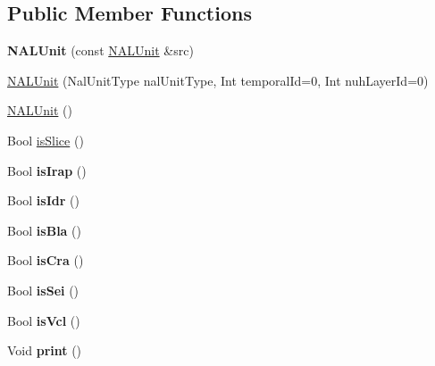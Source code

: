 \subsection*{Public Member Functions}
\begin{DoxyCompactItemize}
\item 
\mbox{\label{struct_n_a_l_unit_af40251f18ebbc6d071fb43be17d742f9}} 
{\bfseries N\+A\+L\+Unit} (const \hyperlink{struct_n_a_l_unit}{N\+A\+L\+Unit} \&src)
\item 
\hyperlink{struct_n_a_l_unit_a6c3d113f4dedfc580c685330abd8d66c}{N\+A\+L\+Unit} (Nal\+Unit\+Type nal\+Unit\+Type, Int temporal\+Id=0, Int nuh\+Layer\+Id=0)
\item 
\hyperlink{struct_n_a_l_unit_a6733403da92fa97139104c47545c9ad7}{N\+A\+L\+Unit} ()
\item 
Bool \hyperlink{struct_n_a_l_unit_a94af464dfd41d51ff179026e02d9926b}{is\+Slice} ()
\item 
\mbox{\label{struct_n_a_l_unit_ab1fee63a3d57d9f4b097070c22bff2bf}} 
Bool {\bfseries is\+Irap} ()
\item 
\mbox{\label{struct_n_a_l_unit_a79ae520a483aa460222f6e400337ff06}} 
Bool {\bfseries is\+Idr} ()
\item 
\mbox{\label{struct_n_a_l_unit_aec31f38c94df5616a26398692881756b}} 
Bool {\bfseries is\+Bla} ()
\item 
\mbox{\label{struct_n_a_l_unit_ab3b3e194ce52c1d26af37fa923509b9c}} 
Bool {\bfseries is\+Cra} ()
\item 
\mbox{\label{struct_n_a_l_unit_a4b5404a66f6fb684ab55bce8ffdaf978}} 
Bool {\bfseries is\+Sei} ()
\item 
\mbox{\label{struct_n_a_l_unit_a801b82cb276b125592d891804ab2f8a9}} 
Bool {\bfseries is\+Vcl} ()
\item 
\mbox{\label{struct_n_a_l_unit_a7a1937ab72316b6d8a76fe1de6e09a88}} 
Void {\bfseries print} ()
\end{DoxyCompactItemize}

